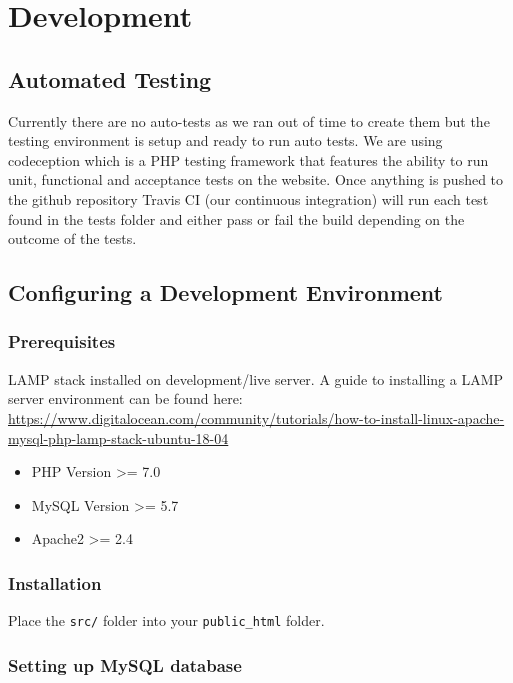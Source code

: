 \documentclass[11pt, a4paper]{article}
\begin{document}
\section{Development}

\subsection{Automated Testing}

Currently there are no auto-tests as we ran out of time to create them but the testing environment is setup and ready to run auto tests.
We are using codeception which is a PHP testing framework that features the ability to run unit, functional and acceptance tests on the website. Once anything is pushed to the github repository Travis CI (our continuous integration) will run each test found in the tests folder and either pass or fail the build depending on the outcome of the tests.


\subsection{Configuring a Development Environment}

\subsubsection{Prerequisites}
LAMP stack installed on development/live server. A guide to installing a LAMP server environment can be found here:\\ \href{https://www.digitalocean.com/community/tutorials/how-to-install-linux-apache-mysql-php-lamp-stack-ubuntu-18-04}{https://www.digitalocean.com/community/tutorials/how-to-install-linux-apache-mysql-php-lamp-stack-ubuntu-18-04}

\begin{itemize}
\item PHP Version \textgreater= 7.0
\item MySQL Version \textgreater= 5.7
\item Apache2 \textgreater= 2.4
\end{itemize}

\subsubsection{Installation}
Place the \texttt{src/} folder into your \texttt{public\_html} folder.

\subsubsection{Setting up MySQL database}
\end{document}
